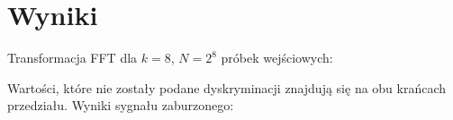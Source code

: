 \documentclass{article}
\begin{document}
\section{Wyniki}
Transformacja FFT dla $k=8$, $N=2^8$ próbek wejściowych:
\begin{figure}[H]
\centering
{}
\linespread{1.5}
\end{figure}
\newline
Wartości, które nie zostały podane dyskryminacji znajdują się na obu krańcach przedziału. 
\newpage
Wyniki sygnału zaburzonego:
\end{document}
